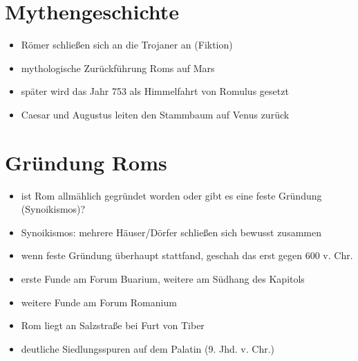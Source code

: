 \documentclass[10pt,a4paper,oneside,ngerman,numbers=noenddot]{scrartcl}
\newenvironment{myitemize}{\begin{itemize}\itemsep -9pt}{\end{itemize}} %
\begin{document}
\section*{Mythengeschichte}
\begin{myitemize}
    \item Römer schließen sich an die Trojaner an (Fiktion)
    \item mythologische Zurückführung Roms auf Mars
    \item später wird das Jahr 753 als Himmelfahrt von Romulus gesetzt
    \item Caesar und Augustus leiten den Stammbaum auf Venus zurück
\end{myitemize}

\section*{Gründung Roms}
\begin{myitemize}
    \item ist Rom allmählich gegründet worden oder gibt es eine feste Gründung (Synoikismos)?
    \item Synoikismos: mehrere Häuser/Dörfer schließen sich bewusst zusammen
    \item wenn feste Gründung überhaupt stattfand, geschah das erst gegen 600 v. Chr.
    \item erste Funde am Forum Buarium, weitere am Südhang des Kapitols
    \item weitere Funde am Forum Romanium
    \item Rom liegt an Salzstraße bei Furt von Tiber
    \item deutliche Siedlungsspuren auf dem Palatin (9. Jhd. v. Chr.)
\end{myitemize}
\end{document}
